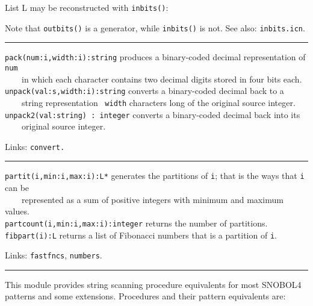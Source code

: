 List L may be reconstructed with \texttt{inbits()}:


Note that \texttt{outbits()} is a generator, while
\texttt{inbits()} is not.
See also: \texttt{inbits.icn}.

\vspace{0.25cm}\hrule{}

\texttt{pack(num:i,width:i):string} produces a binary-coded decimal
representation of \texttt{num}\\
 \ \ \ \  in which each character contains two decimal
digits stored in four bits each.\\
\texttt{unpack(val:s,width:i):string} converts a binary-coded decimal
back to a\\
 \ \ \ \ string representation \ \texttt{width} characters long of the
original source integer.\\
\texttt{unpack2(val:string) : integer} converts a binary-coded decimal
back into its\\
 \ \ \ \ original source integer.

Links: \texttt{convert.}

\vspace{0.25cm}\hrule{}

\texttt{partit(i,min:i,max:i):L*} generates the partitions of
\texttt{i}; that is the ways that \texttt{i} can be\\
 \ \ \ \ represented as a sum of positive integers with minimum
and maximum values.\\
\texttt{partcount(i,min:i,max:i):integer} returns the number of
partitions.\\
\texttt{fibpart(i):L} returns a list of Fibonacci numbers that is a
partition of \texttt{i}.

Links: \texttt{fastfncs}, \texttt{numbers}. 

\vspace{0.25cm}\hrule{}

This module provides string scanning procedure equivalents for most
SNOBOL4 patterns and some
extensions. Procedures and their pattern equivalents are:

